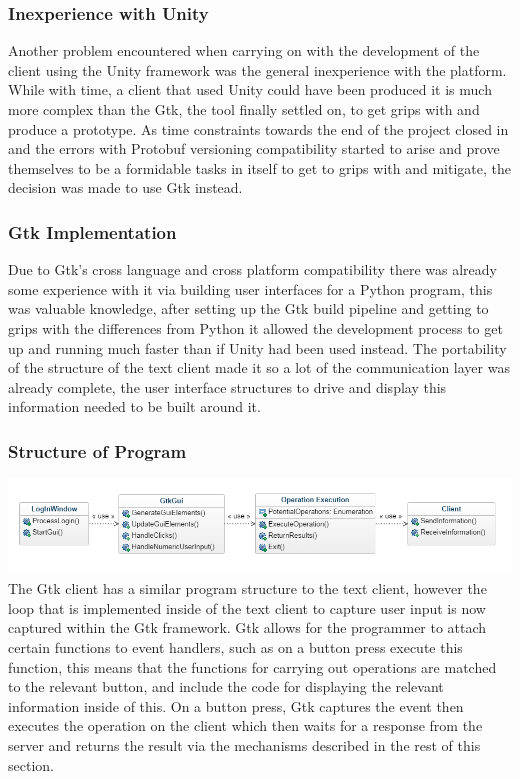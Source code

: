 \documentclass{article}
\begin{document}
\subsubsection{Inexperience with Unity}

Another problem encountered when carrying on with the development of the client using the Unity framework was the general inexperience with the platform. While with time, a client that used Unity could have been produced it is much more complex than the Gtk, the tool finally settled on, to get grips with and produce a prototype. As time constraints towards the end of the project closed in and the errors with Protobuf versioning compatibility started to arise and prove themselves to be a formidable tasks in itself to get to grips with and mitigate, the decision was made to use Gtk instead.

\subsubsection{Gtk Implementation}

Due to Gtk’s cross language and cross platform compatibility there was already some experience with it via building user interfaces for a Python program, this was valuable knowledge, after setting up the Gtk build pipeline and getting to grips with the differences from Python it allowed the development process to get up and running much faster than if Unity had been used instead. The portability of the structure of the text client made it so a lot of the communication layer was already complete, the user interface structures to drive and display this information needed to be built around it.
\subsubsection{Structure of Program}
\includegraphics[width=\textwidth]{gtkclient.png}
The Gtk client has a similar program structure to the text client, however the loop that is implemented inside of the text client to capture user input is now captured within the Gtk framework. Gtk allows for the programmer to attach certain functions to event handlers, such as on a button press execute this function, this means that the functions for carrying out operations are matched to the relevant button, and include the code for displaying the relevant information inside of this. On a button press, Gtk captures the event then executes the operation on the client which then waits for a response from the server and returns the result via the mechanisms described in the rest of this section.
\end{document}
